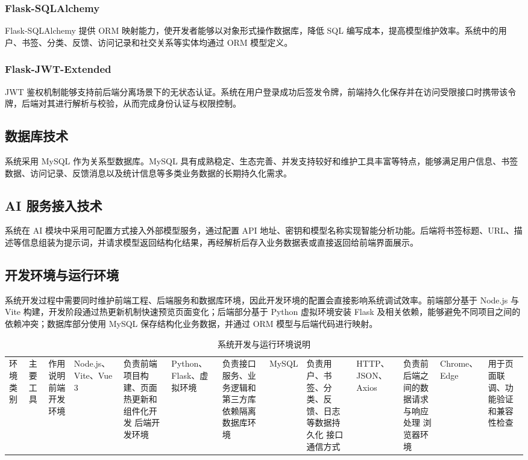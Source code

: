 \documentclass[12pt,a4paper]{ctexart}
\begin{document}
\subsubsection{Flask-SQLAlchemy}
Flask-SQLAlchemy 提供 ORM 映射能力，使开发者能够以对象形式操作数据库，降低 SQL 编写成本，提高模型维护效率。系统中的用户、书签、分类、反馈、访问记录和社交关系等实体均通过 ORM 模型定义。

\subsubsection{Flask-JWT-Extended}
JWT 鉴权机制能够支持前后端分离场景下的无状态认证。系统在用户登录成功后签发令牌，前端持久化保存并在访问受限接口时携带该令牌，后端对其进行解析与校验，从而完成身份认证与权限控制。

\subsection{数据库技术}
系统采用 MySQL 作为关系型数据库。MySQL 具有成熟稳定、生态完善、并发支持较好和维护工具丰富等特点，能够满足用户信息、书签数据、访问记录、反馈消息以及统计信息等多类业务数据的长期持久化需求。

\subsection{AI 服务接入技术}
系统在 AI 模块中采用可配置方式接入外部模型服务，通过配置 API 地址、密钥和模型名称实现智能分析功能。后端将书签标题、URL、描述等信息组装为提示词，并请求模型返回结构化结果，再经解析后存入业务数据表或直接返回给前端界面展示。


\subsection{开发环境与运行环境}
系统开发过程中需要同时维护前端工程、后端服务和数据库环境，因此开发环境的配置会直接影响系统调试效率。前端部分基于 Node.js 与 Vite 构建，开发阶段通过热更新机制快速预览页面变化；后端部分基于 Python 虚拟环境安装 Flask 及相关依赖，能够避免不同项目之间的依赖冲突；数据库部分使用 MySQL 保存结构化业务数据，并通过 ORM 模型与后端代码进行映射。

\begin{table}[H]
\centering
\caption{系统开发与运行环境说明}
\begin{tabular}{p{3.2cm}p{4.2cm}p{6cm}}
\toprule
环境类别 & 主要工具 & 作用说明 
\midrule
前端开发环境 & Node.js、Vite、Vue 3 & 负责前端项目构建、页面热更新和组件化开发 
后端开发环境 & Python、Flask、虚拟环境 & 负责接口服务、业务逻辑和第三方库依赖隔离 
数据库环境 & MySQL & 负责用户、书签、分类、反馈、日志等数据持久化 
接口通信方式 & HTTP、JSON、Axios & 负责前后端之间的数据请求与响应处理 
浏览器环境 & Chrome、Edge & 用于页面联调、功能验证和兼容性检查 
\bottomrule
\end{tabular}
\end{table}
\end{document}
